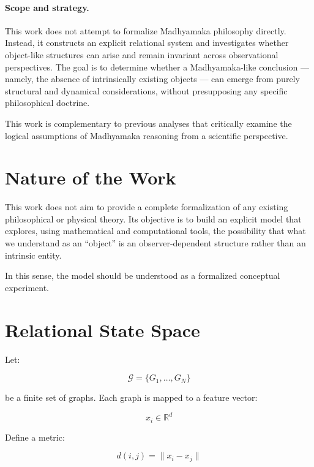 \documentclass[11pt]{article}
\begin{document}
\paragraph{Scope and strategy.}
This work does not attempt to formalize Madhyamaka philosophy directly. Instead, it constructs an explicit relational system and investigates whether object-like structures can arise and remain invariant across observational perspectives. The goal is to determine whether a Madhyamaka-like conclusion --- namely, the absence of intrinsically existing objects --- can emerge from purely structural and dynamical considerations, without presupposing any specific philosophical doctrine.

This work is complementary to previous analyses that critically examine the logical assumptions of Madhyamaka reasoning from a scientific perspective.

\section{Nature of the Work}

This work does not aim to provide a complete formalization of any existing philosophical or physical theory. 
Its objective is to build an explicit model that explores, using mathematical and computational tools, 
the possibility that what we understand as an ``object'' is an observer-dependent structure 
rather than an intrinsic entity.

In this sense, the model should be understood as a formalized conceptual experiment.

\section{Relational State Space}

Let:

\begin{equation}
\mathcal{G} = \{G_1, \dots, G_N\}
\end{equation}

be a finite set of graphs. Each graph is mapped to a feature vector:

\begin{equation}
x_i \in \mathbb{R}^d
\end{equation}

Define a metric:

\begin{equation}
d(i,j) = \|x_i - x_j\|
\end{equation}
\end{document}
